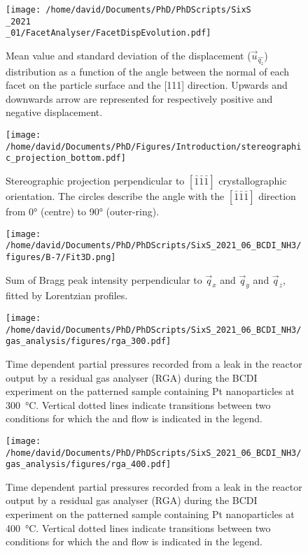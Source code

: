 \begin{figure}[!htb]
    \centering
    \texttt{[image: /home/david/Documents/PhD/PhDScripts/SixS\\\_2021\\\_01/FacetAnalyser/FacetDispEvolution.pdf]}
    \caption{
        Mean value and standard deviation of the displacement ($\vec{u}_{\hat{q_z}}$) distribution as a function of the angle between the normal of each facet on the particle surface and the [111] direction.
        Upwards and downwards arrow are represented for respectively positive and negative displacement.
    }
    \label{fig:AmaterasuDisplacement}
\end{figure}

\begin{figure}[!htb]
    \centering
    \texttt{[image: /home/david/Documents/PhD/Figures/Introduction/stereographic\_projection\_bottom.pdf]}
    \caption{
        Stereographic projection perpendicular to $[\bar{1}\bar{1}\bar{1}]$ crystallographic orientation.
        The circles describe the angle with the $[\bar{1}\bar{1}\bar{1}]$ direction from \ang{0} (centre) to \ang{90} (outer-ring).
    }
    \label{fig:StereoBottom}
\end{figure}

\begin{figure}[!htb]
    \centering
    \texttt{[image: /home/david/Documents/PhD/PhDScripts/SixS\_2021\_06\_BCDI\_NH3/figures/B-7/Fit3D.png]}
    \caption{
        Sum of Bragg peak intensity perpendicular to $\vec{q}_x$ and $\vec{q}_y$ and $\vec{q}_z$, fitted by Lorentzian profiles.
    }
    \label{fig:FitB73D}
\end{figure}

\begin{figure}[!htb]
    \centering
    \texttt{[image: /home/david/Documents/PhD/PhDScripts/SixS\_2021\_06\_BCDI\_NH3/gas\_analysis/figures/rga\_300.pdf]}
    \caption{
        Time dependent partial pressures recorded from a leak in the reactor output by a residual gas analyser (RGA) during the BCDI experiment on the patterned sample containing Pt nanoparticles at \qty{300}{\degreeCelsius}.
        Vertical dotted lines indicate transitions between two conditions for which the  and  flow is indicated in the legend.
    }
    \label{fig:RGA300BCDINanoparticles}
\end{figure}

\begin{figure}[!htb]
    \centering
    \texttt{[image: /home/david/Documents/PhD/PhDScripts/SixS\_2021\_06\_BCDI\_NH3/gas\_analysis/figures/rga\_400.pdf]}
    \caption{
        Time dependent partial pressures recorded from a leak in the reactor output by a residual gas analyser (RGA) during the BCDI experiment on the patterned sample containing Pt nanoparticles at \qty{400}{\degreeCelsius}.
        Vertical dotted lines indicate transitions between two conditions for which the  and  flow is indicated in the legend.
    }
    \label{fig:RGA400BCDINanoparticles}
\end{figure}
